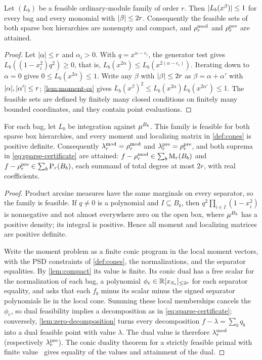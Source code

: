 \begin{lemma}[Compactness]\label{lem:compact}
Let $(L_b)$ be a feasible ordinary-module family of order $r$. Then
$\lvert L_b(x^\beta)\rvert\le1$ for every bag and every monomial with
$\lvert \beta\rvert\le2r$. Consequently the feasible sets of both sparse box
hierarchies are nonempty and compact, and $\rho^{\mathrm{mod}}_r$ and $\rho^{\mathrm{pre}}_r$ are
attained.
\end{lemma}

\begin{proof}
Let $\lvert \alpha\rvert\le r$ and $\alpha_i>0$. With $q=x^{\alpha-e_i}$, the
generator test gives $L_b((1-x_i^2)q^2)\ge0$, that is,
$L_b(x^{2\alpha})\le L_b(x^{2(\alpha-e_i)})$. Iterating down to $\alpha=0$
gives $0\le L_b(x^{2\alpha})\le1$. Write any $\beta$ with $\lvert \beta\rvert\le2r$
as $\beta=\alpha+\alpha'$ with $\lvert \alpha\rvert,\lvert \alpha'\rvert\le r$;
\cref{lem:moment-cs} gives
$L_b(x^\beta)^2\le L_b(x^{2\alpha})L_b(x^{2\alpha'})\le1$. The feasible sets
are defined by finitely many closed conditions on finitely many bounded
coordinates, and they contain point evaluations.
\end{proof}

\begin{lemma}\label{lem:slater}
For each bag, let $L_b$ be integration against $\mu^{B_b}$. This family is
feasible for both sparse box hierarchies, and every moment and localizing
matrix in \cref{def:cones} is positive definite. Consequently
$\lambda^{\mathrm{mod}}_r=\rho^{\mathrm{mod}}_r$ and $\lambda^{\mathrm{pre}}_r=\rho^{\mathrm{pre}}_r$, and both suprema in
\eqref{eq:sparse-certificate} are attained: $f-\rho^{\mathrm{mod}}_r\in\sum_b\mathrm{M}_r(B_b)$
and $f-\rho^{\mathrm{pre}}_r\in\sum_b\mathrm{P}_r(B_b)$, each summand of total degree at most
$2r$, with real coefficients.
\end{lemma}

\begin{proof}
Product arcsine measures have the same marginals on every separator, so the
family is feasible. If $q\ne0$ is a polynomial and $I\subseteq B_b$, then
$q^2\prod_{i\in I}(1-x_i^2)$ is nonnegative and not almost everywhere zero
on the open box, where $\mu^{B_b}$ has a positive density; its integral is
positive. Hence all moment and localizing matrices are positive definite.

Write the moment problem as a finite conic program in the local moment
vectors, with the PSD constraints of \cref{def:cones}, the normalizations,
and the separator equalities. By \cref{lem:compact} its value is finite.
Its conic dual has a free scalar for the normalization of each bag, a
polynomial $\phi_e\in\mathbb{R}[x_{S_e}]_{\le 2r}$ for each separator equality, and
asks that each $f_b$ minus its scalar minus the signed separator
polynomials lie in the local cone. Summing these local memberships cancels
the $\phi_e$, so dual feasibility implies a decomposition as in
\eqref{eq:sparse-certificate}; conversely, \cref{lem:zero-decomposition}
turns every decomposition $f-\lambda=\sum_bq_b$ into a dual feasible point
with value $\lambda$. The dual value is therefore $\lambda^{\mathrm{mod}}_r$ (respectively
$\lambda^{\mathrm{pre}}_r$). The conic duality theorem for a strictly feasible primal with
finite value~\cite{bental2001-lectures-modern-convex} gives equality of
the values and attainment of the dual.
\end{proof}

